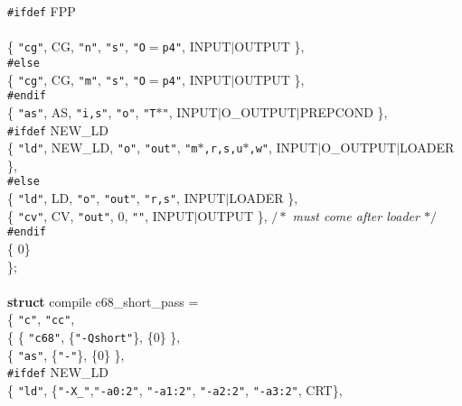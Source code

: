 \begin{flushleft}
{\tt \#ifdef} FPP\mbox{}\\
\mbox{}\\
\hspace*{3\indentation}\{ {\tt"cg"}, CG, {\tt"n"}, {\tt"s"}, {\tt"O$=$p4"}, INPUT$\mid$OUTPUT \},\mbox{}\\
{\tt \#else}\mbox{}\\
\hspace*{3\indentation}\{ {\tt"cg"}, CG, {\tt"m"}, {\tt"s"}, {\tt"O$=$p4"}, INPUT$\mid$OUTPUT \},\mbox{}\\
{\tt \#endif}\mbox{}\\
\hspace*{3\indentation}\{ {\tt"as"}, AS, {\tt"i,s"}, {\tt"o"}, {\tt"T$\ast$"}, INPUT$\mid$O\_OUTPUT$\mid$PREPCOND \},\mbox{}\\
{\tt \#ifdef} NEW\_LD\mbox{}\\
\hspace*{3\indentation}\{ {\tt"ld"}, NEW\_LD, {\tt"o"}, {\tt"out"}, {\tt"m$\ast$,r,s,u$\ast$,w"}, INPUT$\mid$O\_OUTPUT$\mid$LOADER \},\mbox{}\\
{\tt \#else}\mbox{}\\
\hspace*{3\indentation}\{ {\tt"ld"}, LD, {\tt"o"}, {\tt"out"}, {\tt"r,s"}, INPUT$\mid$LOADER \},\mbox{}\\
\hspace*{3\indentation}\{ {\tt"cv"}, CV, {\tt"out"}, 0, {\tt""}, INPUT$\mid$OUTPUT \}, {$/\ast$\it{} must come after loader $\ast/$}\mbox{}\\
{\tt \#endif}\mbox{}\\
\hspace*{3\indentation}\{ 0\}\mbox{}\\
\};\mbox{}\\
\mbox{}\\
{\bf struct} compile c68\_short\_pass =\mbox{}\\
\{  {\tt"c"}, {\tt"cc"},\mbox{}\\
\hspace*{3\indentation}\{  \{ {\tt"c68"}, \{{\tt"-Qshort"}\}, \{0\} \},\mbox{}\\
\hspace*{6\indentation}\{ {\tt"as"}, \{{\tt"-"}\}, \{0\} \},\mbox{}\\
{\tt \#ifdef} NEW\_LD\mbox{}\\
\hspace*{6\indentation}\{ {\tt"ld"}, \{{\tt"-X\_"},{\tt"-a0:2"}, {\tt"-a1:2"}, {\tt"-a2:2"}, {\tt"-a3:2"}, CRT\},\mbox{}\\

\end{flushleft}
